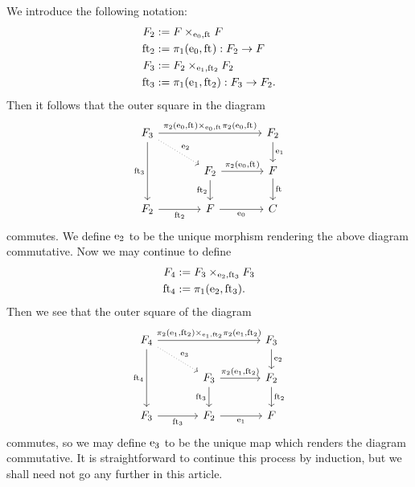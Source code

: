 \begin{defn}
We introduce the following notation:
\begin{align*}
\stesysf_2 
  & := \stesysff
  \\
\eft[2] 
  & := \pullbackpr{1}{\ectxext}{\eft} : \stesysf_2\to\stesysf
  \\
\stesysf_3 & := \pullback{\stesysf_2}{\stesysf_2}{\efamext}{\eft[2]}
  \\
\eft[3]
  & := \pullbackpr{1}{\efamext}{\eft[2]} : \stesysf_3\to\stesysf_2.
\end{align*}
Then it follows that the outer square in the diagram
\begin{equation*}
\begin{tikzcd}[column sep=large]
\stesysf_3
  \ar[dotted]{dr}{\eext{2}}
  \ar{rr}{\pullback{\pullbackpr{2}{\ectxext}{\eft}}{\pullbackpr{2}{\ectxext}{\eft}}{\ectxext}{\eft}}
  \ar{dd}[swap]{\eft[3]}
  & 
  &
\stesysf_2
  \ar{d}{\efamext}
  \\
  &
\stesysf_2
  \ar{d}[swap]{\eft[2]}
  \ar{r}{\pullbackpr{2}{\ectxext}{\eft}}
  &
\stesysf
  \ar{d}{\eft}
  \\
\stesysf_2
  \ar{r}[swap]{\eft[2]}
  &
\stesysf
  \ar{r}[swap]{\ectxext}
  &
\stesysc
\end{tikzcd}
\end{equation*}
commutes. We define $\mathrm{e}_{2}$ to be the unique morphism rendering the above diagram
commutative. Now we may continue to define
\begin{align*}
\stesysf_4 
  & := 
\pullback{\stesysf_3}{\stesysf_3}{\eext{2}}{\eft[3]}
  \\
\eft[4] 
  & := 
\pullbackpr{1}{\eext{2}}{\eft[3]}.
\end{align*}
Then we see that the outer square of the diagram
\begin{equation*}
\begin{tikzcd}[column sep=large]
\stesysf_4
  \ar[dotted]{dr}{\eext{3}}
  \ar{rr}{\pullback{\pullbackpr{2}{\efamext}{\eft[2]}}{\pullbackpr{2}{\efamext}{\eft[2]}}{\efamext}{\eft[2]}}
  \ar{dd}[swap]{\eft[4]}
  & 
  &
\stesysf_3
  \ar{d}{\eext{2}}
  \\
  &
\stesysf_3
  \ar{d}[swap]{\eft[3]}
  \ar{r}{\pullbackpr{2}{\efamext}{\eft[2]}}
  &
\stesysf_2
  \ar{d}{\eft[2]}
  \\
\stesysf_3
  \ar{r}[swap]{\eft[3]}
  &
\stesysf_2
  \ar{r}[swap]{\efamext}
  &
\stesysf
\end{tikzcd}
\end{equation*}
commutes,
so we may define $\mathrm{e}_{3}$ to be the unique map which renders the diagram
commutative. It
is straightforward to continue this process by induction, but we shall need not
go any further in this article.
\end{defn}

